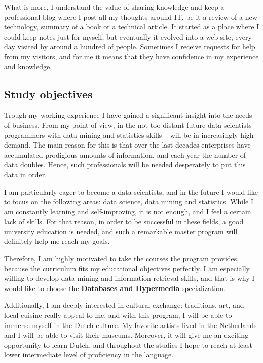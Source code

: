 \documentclass[a4paper,12pt]{article}
\begin{document}
What is more, I understand the value of sharing knowledge and keep a professional blog where I post all my thoughts around IT, be it a review of a new technology, summary of a book or a technical article. It started as a place where I could keep notes just for myself, but eventually it evolved into a web site, every day visited by around a hundred of people. Sometimes I receive requests for help from my visitors, and for me it means that they have confidence in my experience and knowledge.

\subsection*{Study objectives}

Trough my working experience I have gained a significant insight into the needs of business. From my point of view, in the not too distant future data scientists -- programmers with data mining and statistics skills -- will be in increasingly high demand. The main reason for this is that over the last decades enterprises have accumulated prodigious amounts of information, and each year the number of data doubles. Hence, such professionals will be needed desperately to put this data in order.

I am particularly eager to become a data scientists, and in the future I would like to focus on the following areas: data science, data mining and statistics. While I am constantly learning and self-improving, it is not enough, and I feel a certain lack of skills. For that reason, in order to be successful in these fields, a good university education is needed, and such a remarkable master program will definitely help me reach my goals.

Therefore, I am highly motivated to take the courses the program provides, because the curriculum fits my educational objectives perfectly. I am especially willing to develop data mining and information retrieval skills, and that is why I would like to choose the \textbf{Databases and Hypermedia} specialization.

Additionally, I am deeply interested in cultural exchange: traditions, art, and local cuisine really appeal to me, and with this program, I will be able to immerse myself in the Dutch culture. My favorite artists lived in the Netherlands and I will be able to visit their museums. Moreover, it will give me an exciting opportunity to learn Dutch, and throughout the studies I hope to reach at least lower intermediate level of proficiency in the language.
\end{document}
